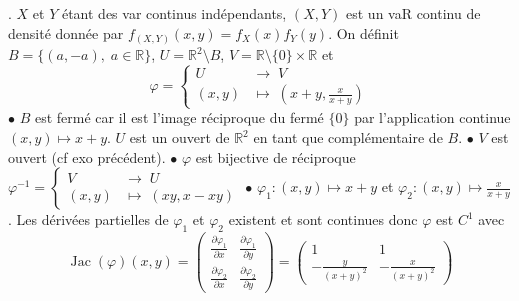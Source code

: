 \documentclass{report}
\begin{document}
\subsection{} \noindent{}\\ 
\\ 
\\
. $X$ et $Y$ étant des var continus indépendants, $(X,Y)$ est un vaR continu de densité donnée par $f_{(X,Y)}(x,y)=f_X(x)f_Y(y)$.\newline
\newline
On définit $B=\{(a,-a), \; a\in \mathbb R\}$, $U=\mathbb R^2\setminus B$, $V=\mathbb R\setminus \{0\} \times \mathbb R$
et  $$\varphi=
    \begin{cases}
      U & \longrightarrow \; V \\
      (x,y) & \longmapsto \; (x+y,\frac{x}{x+y})
    \end{cases}$$ \newline
$\bullet$ $B$ est fermé car il est l'image réciproque du fermé $\{0\}$ par l'application continue $(x,y)\mapsto x+y$. $U$ est un ouvert de $\mathbb R^2$ en tant que complémentaire de $B$.\newline
$\bullet$ $V$ est ouvert (cf exo précédent).\newline
$\bullet$ $\varphi$ est bijective de réciproque $\varphi^{-1}=\begin{cases}
      V & \longrightarrow \; U \\
      (x,y) & \longmapsto \; (xy,x-xy)
    \end{cases}$ \newline
$\bullet$ $\varphi_1\colon (x,y) \mapsto x+y$ et $\varphi_2\colon (x,y) \mapsto \frac{x}{x+y}$. Les dérivées partielles de $\varphi_1$ et $\varphi_2$  existent et sont continues donc $\varphi$ est $C^1$ avec $$ \operatorname{Jac}(\varphi)(x,y)  =\begin{pmatrix} 
\frac{\partial \varphi_1}{\partial x} & \frac{\partial \varphi_1}{\partial y} \\
\frac{\partial \varphi_2}{\partial x} & \frac{\partial \varphi_2}{\partial y}
\end{pmatrix} = \begin{pmatrix}
1 & 1 \\
-\frac{y}{(x+y)^2} & -\frac{x}{(x+y)^2}
\end{pmatrix}$$ \newline 
\end{document}
